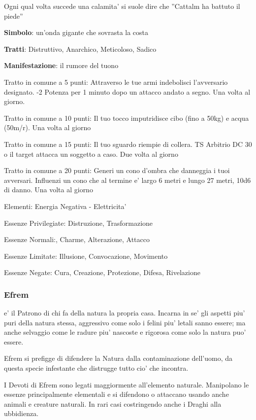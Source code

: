 \documentclass[a4paper,11pt,twoside,openany]{book}
\begin{document}
{Ogni qual volta succede una calamita' si suole dire che ''Cattalm ha battuto il piede''

\textbf{Simbolo}: un'onda gigante che sovrasta la costa

\textbf{Tratti}: Distruttivo, Anarchico, Meticoloso, Sadico

\textbf{Manifestazione}: il rumore del tuono

\bigskip

Tratto in comune a 5 punti: Attraverso le tue armi indebolisci l'avversario designato. -2 Potenza per 1 minuto dopo un attacco andato a segno. Una volta al giorno.

Tratto in comune a 10 punti: Il tuo tocco imputridisce cibo (fino a 50kg) e acqua (50m/r). Una volta al giorno

Tratto in comune a 15 punti: Il tuo sguardo riempie di collera. TS Arbitrio DC 30 o il target attacca un soggetto a caso. Due volta al giorno

Tratto in comune a 20 punti: Generi un cono d'ombra che danneggia i tuoi avversari. Influenzi un cono che al termine e' largo 6 metri e lungo 27 metri, 10d6 di danno. Una volta al giorno

\bigskip

Elementi: Energia Negativa - Elettricita'

\bigskip

Essenze Privilegiate: Distruzione, Trasformazione

Essenze Normali:, Charme, Alterazione, Attacco

Essenze Limitate: Illusione, Convocazione, Movimento
 
Essenze Negate: Cura, Creazione, Protezione, Difesa, Rivelazione

\subsubsection{Efrem}

\label{efrem}

e' il Patrono di chi fa della natura la propria casa. Incarna in se' gli aspetti piu' puri della natura stessa, aggressivo come solo i felini piu' letali sanno essere; ma anche selvaggio come le radure piu' nascoste e rigorosa come solo la natura puo' essere.

Efrem si prefigge di difendere la Natura dalla contaminazione dell'uomo, da questa specie infestante che distrugge tutto cio' che incontra.

I Devoti di Efrem sono legati maggiormente all'elemento naturale. Manipolano le essenze principalmente elementali e si difendono o attaccano usando anche animali e creature naturali. In rari casi costringendo anche i Draghi alla ubbidienza.

}
\end{document}
